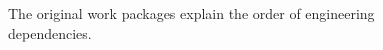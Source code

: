 \begin{figure}[H]
\centering
{}
\caption{The original work packages explain the order of engineering dependencies.}\label{fig:teach-P-04-prototype-02}
\end{figure}
